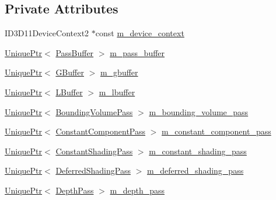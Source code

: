 \subsection*{Private Attributes}
\begin{DoxyCompactItemize}
\item 
I\+D3\+D11\+Device\+Context2 $\ast$const \hyperlink{classmage_1_1_scene_renderer_a163ff32807bea62e11fa06c5adf2a291}{m\+\_\+device\+\_\+context}
\item 
\hyperlink{namespacemage_a3316d7143a973e37adf1110f2e80ca31}{Unique\+Ptr}$<$ \hyperlink{structmage_1_1_pass_buffer}{Pass\+Buffer} $>$ \hyperlink{classmage_1_1_scene_renderer_a9801d415ee0113f9d2a53802df0cb7ba}{m\+\_\+pass\+\_\+buffer}
\item 
\hyperlink{namespacemage_a3316d7143a973e37adf1110f2e80ca31}{Unique\+Ptr}$<$ \hyperlink{structmage_1_1_g_buffer}{G\+Buffer} $>$ \hyperlink{classmage_1_1_scene_renderer_ad4a2b9abc762584bd9aceccb5f47b9c4}{m\+\_\+gbuffer}
\item 
\hyperlink{namespacemage_a3316d7143a973e37adf1110f2e80ca31}{Unique\+Ptr}$<$ \hyperlink{structmage_1_1_l_buffer}{L\+Buffer} $>$ \hyperlink{classmage_1_1_scene_renderer_a161937c096a625d701498202d82e8ed7}{m\+\_\+lbuffer}
\item 
\hyperlink{namespacemage_a3316d7143a973e37adf1110f2e80ca31}{Unique\+Ptr}$<$ \hyperlink{classmage_1_1_bounding_volume_pass}{Bounding\+Volume\+Pass} $>$ \hyperlink{classmage_1_1_scene_renderer_a9d10194ae2ab807b241b078f8bb6430a}{m\+\_\+bounding\+\_\+volume\+\_\+pass}
\item 
\hyperlink{namespacemage_a3316d7143a973e37adf1110f2e80ca31}{Unique\+Ptr}$<$ \hyperlink{classmage_1_1_constant_component_pass}{Constant\+Component\+Pass} $>$ \hyperlink{classmage_1_1_scene_renderer_a34006a25d67bbe2aa4f25a61dee8cd2f}{m\+\_\+constant\+\_\+component\+\_\+pass}
\item 
\hyperlink{namespacemage_a3316d7143a973e37adf1110f2e80ca31}{Unique\+Ptr}$<$ \hyperlink{classmage_1_1_constant_shading_pass}{Constant\+Shading\+Pass} $>$ \hyperlink{classmage_1_1_scene_renderer_a2e98538d6add0603a2da5b949aa26953}{m\+\_\+constant\+\_\+shading\+\_\+pass}
\item 
\hyperlink{namespacemage_a3316d7143a973e37adf1110f2e80ca31}{Unique\+Ptr}$<$ \hyperlink{classmage_1_1_deferred_shading_pass}{Deferred\+Shading\+Pass} $>$ \hyperlink{classmage_1_1_scene_renderer_a05aa800b776f98b8b11e2d38a25c07e5}{m\+\_\+deferred\+\_\+shading\+\_\+pass}
\item 
\hyperlink{namespacemage_a3316d7143a973e37adf1110f2e80ca31}{Unique\+Ptr}$<$ \hyperlink{classmage_1_1_depth_pass}{Depth\+Pass} $>$ \hyperlink{classmage_1_1_scene_renderer_abdb26cf0c454d1e5a7fed949191c1044}{m\+\_\+depth\+\_\+pass}

\end{DoxyCompactItemize}
